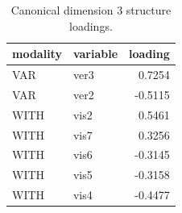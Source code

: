 \begin{table}
\caption{Canonical dimension 3 structure loadings.}
\label{tab:cca_dimension_3_loadings}
\begin{tabular}{llr}
\toprule
modality & variable & loading \\
\midrule
VAR & ver3 & 0.7254 \\
VAR & ver2 & -0.5115 \\
WITH & vis2 & 0.5461 \\
WITH & vis7 & 0.3256 \\
WITH & vis6 & -0.3145 \\
WITH & vis5 & -0.3158 \\
WITH & vis4 & -0.4477 \\
\bottomrule
\end{tabular}
\end{table}
